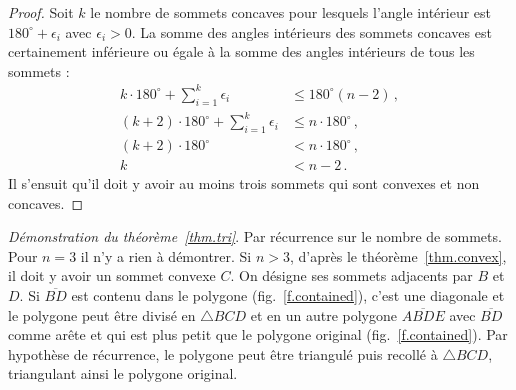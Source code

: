 \begin{proof} Soit $k$ le nombre de sommets concaves pour lesquels l'angle intérieur est $180^\circ+\epsilon_i$ avec $\epsilon_i>0$. La somme des angles intérieurs des sommets concaves est certainement inférieure ou égale à la somme des angles intérieurs de tous les sommets :
%
\begin{align*}
k\cdot 180^\circ +\displaystyle\sum_{i=1}^{k}\epsilon_i &\leq 180^\circ(n-2)\,,\\
(k+2)\cdot 180^\circ +\displaystyle\sum_{i=1}^{k}\epsilon_i &\leq n\cdot 180^\circ\,,\\
(k+2)\cdot 180^\circ &< n\cdot 180^\circ\,,\\
k&<n-2\,.
\end{align*}
Il s'ensuit qu'il doit y avoir au moins trois sommets qui sont convexes et non concaves.
\end{proof}

\noindent \emph{Démonstration du théorème~\ref{thm.tri}}. 
Par récurrence sur le nombre de sommets. Pour $n=3$ il n'y a rien à démontrer. Si $n>3$, d'après le théorème~\ref{thm.convex}, il doit y avoir un sommet convexe $C$. On désigne ses sommets adjacents par $B$ et $D$. Si $\overline{BD}$ est contenu dans le polygone (fig.~\ref{f.contained}), c'est une diagonale et le polygone peut être divisé en $\triangle BCD$ et en un autre polygone $\overline{ABDE}$ avec $\overline{BD}$ comme arête et qui est plus petit que le polygone original (fig.~\ref{f.contained}). Par hypothèse de récurrence, le polygone peut être triangulé puis recollé à $\triangle BCD$, triangulant ainsi le polygone original.

\vspace{0.4cm}


